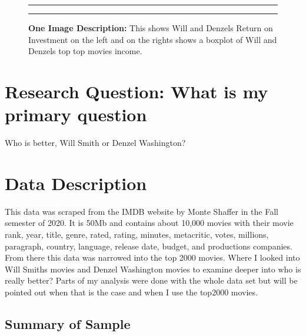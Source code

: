 \documentclass[]{article}
\begin{document}
\begin{figure}[!ht]
    \hrule
    \begin{center}
    \end{center}
    \label{fig:oneimage-1}
    \caption{ \textbf{One Image Description:} This shows Will and Denzels Return on Investment on the left and on the rights shows a boxplot of Will and Denzels top top movies income.}
    \hrule
\end{figure}

\section{Research Question:  What is my primary question}
\label{sec:rq}

Who is better, Will Smith or Denzel Washington?

\section{Data Description}
\label{sec:data}

This data was scraped from the IMDB website by Monte Shaffer in the Fall
semester of 2020. It is 50Mb and contains about 10,000 movies with their
movie rank, year, title, genre, rated, rating, minutes, metacritic,
votes, millions, paragraph, country, language, release date, budget, and
productions companies. From there this data was narrowed into the top
2000 movies. Where I looked into Will Smiths movies and Denzel
Washington movies to examine deeper into who is really better? Parts of
my analysis were done with the whole data set but will be pointed out
when that is the case and when I use the top2000 movies.

\subsection{Summary of Sample}
\label{sec:data-sample}
\end{document}

